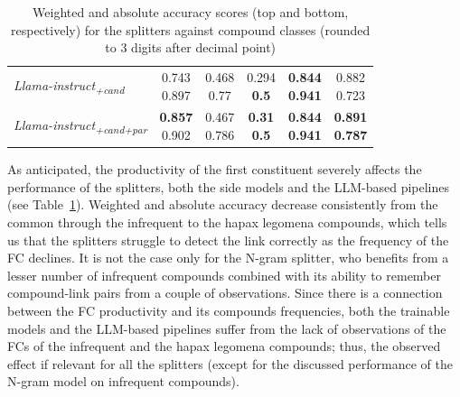 \documentclass[11pt]{article}
\begin{document}
\begin{table}[htb!]
\begin{tabular}{@{}lccccc@{}}
        \textit{Llama-instruct\textsubscript{+cand}} & \makecell{0.743 \\ 0.897} & \makecell{0.468 \\ 0.77} & \makecell{0.294 \\ \textbf{0.5}} & \makecell{\textbf{0.844} \\ \textbf{0.941}} & \makecell{0.882 \\ 0.723} & \\
        \textit{Llama-instruct\textsubscript{+cand+par}} & \makecell{\textbf{0.857} \\ 0.902} & \makecell{0.467 \\ 0.786} & \makecell{\textbf{0.31} \\ \textbf{0.5}} & \makecell{\textbf{0.844} \\ \textbf{0.941}} & \makecell{\textbf{0.891} \\ \textbf{0.787}} \\
        \bottomrule
    \end{tabular}
    \caption{Weighted and absolute accuracy scores (top and bottom, respectively) for the splitters against compound classes (rounded to 3 digits after decimal point)}
    \label{tab:metrics_by_classes}
\end{table}

As anticipated, the productivity of the first constituent severely affects the performance of the splitters, both the side models and the LLM-based pipelines (see Table~\ref{tab:metrics_by_classes}). Weighted and absolute accuracy decrease consistently from the common through the infrequent to the hapax legomena compounds, which tells us that the splitters struggle to detect the link correctly as the frequency of the FC declines. It is not the case only for the N-gram splitter, who benefits from a lesser number of infrequent compounds combined with its ability to remember compound-link pairs from a couple of observations. Since there is a connection between the FC productivity and its compounds frequencies, both the trainable models and the LLM-based pipelines suffer from the lack of observations of the FCs of the infrequent and the hapax legomena compounds; thus, the observed effect if relevant for all the splitters (except for the discussed performance of the N-gram model on infrequent compounds).
\end{document}

